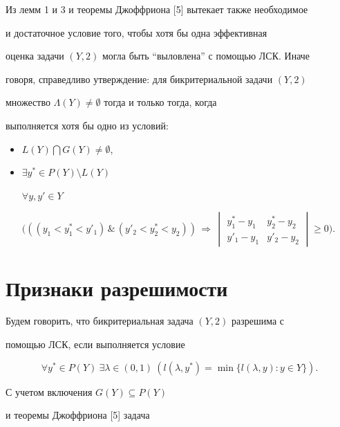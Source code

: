  


Из лемм 1 и 3 и теоремы Джоффриона [5] вытекает также необходимое 


и достаточное условие того, чтобы хотя бы одна эффективная 


оценка задачи $(Y,2)$ могла быть ``выловлена'' с помощью ЛСК. Иначе 


говоря, справедливо утверждение: для бикритериальной задачи $(Y,2)$ 


множество $\Lambda(Y)\ne\emptyset$ тогда и только тогда, когда 


выполняется хотя бы одно из условий: 


\begin{itemize} 


\item[(i)] $L(Y)\bigcap G(Y)\ne\emptyset$, 


\item[(ii)] $\exists y^*\in P(Y)\setminus L(Y)$  


$\forall y,y'\in Y$


$\Big(((y_1<y^*_1<y'_1)\,\&\,(y'_2<y^*_2<y_2))\, 


\Longrightarrow\,\begin{vmatrix} 


y^*_1-y_1 & y^*_2-y_2 \\ y'_1-y_1 & y'_2-y_2 


\end{vmatrix}\ge 0\Big)$.


\end{itemize} 


 


\section{Признаки разрешимости} 


 


Будем говорить, что бикритериальная задача $(Y,2)$ разрешима с 


помощью ЛСК, если выполняется условие 


$$ 


\forall y^*\in P(Y)\ \exists\lambda\in(0,1)\ (l(\lambda,y^*)= 


\min\{l(\lambda,y):y\in Y\}). 


$$ 


С учетом включения $G(Y)\subseteq P(Y)$ 


и теоремы Джоффриона [5] задача 


